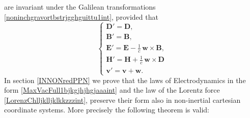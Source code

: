 \documentclass{article}
\theoremstyle{definition}
\theoremstyle{remark}
\renewcommand{\vec}[1]{\mathbf{#1}}
\newcommand{\er}{\eqref}
\newcommand{\er}{\eqref}
\begin{document}
are invariant under the Galilean transformations
\er{noninchgravortbstrjgghguittu1int}, provided that
\begin{equation}\label{EBDHTrans2kkkint}
\begin{cases}
\vec D'=\vec D,\\
\vec B'=\vec B,\\
\vec E'=\vec E-\frac{1}{c}\,\vec w\times \vec B,\\
\vec H'=\vec H+\frac{1}{c}\,\vec w\times \vec D\\
\vec v'=\vec v+\vec w.
\end{cases}
\end{equation}
In section \ref{INNONredPPN} we prove that the laws of
Electrodynamics in the form \er{MaxVacFull1bjkgjhjhgjaaaint} and the
law of the Lorentz force \er{LorenzChlljklljklkkzzzint}, preserve
their form also in non-inertial cartesian coordinate systems. More
precisely the following theorem is valid:
\end{document}
